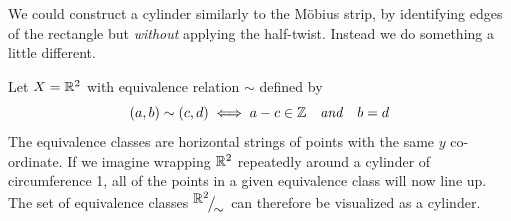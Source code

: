 

We could construct a cylinder similarly to the Möbius strip, by identifying edges of the rectangle but \emph{without} applying the half-twist. Instead we do something a little different.\par

Let $X=\mathbb{R}^2$ with equivalence relation $\sim$ defined by
\[
	(a,b)\sim (c,d)\iff a-c\in\mathbb{Z}\quad\text{\emph{and}}\quad b=d
\]
The equivalence classes are horizontal strings of points with the same $y$ co-ordinate. If we imagine wrapping $\mathbb{R}^2$ repeatedly around a cylinder of circumference 1, all of the points in a given equivalence class will now line up. The set of equivalence classes ${}^{\textstyle {\mathbb{R}^2}}\!\big/_{\textstyle \!{\sim}}$ can therefore be visualized as a cylinder.

